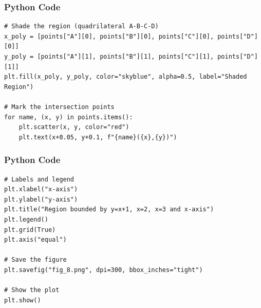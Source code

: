 \documentclass{beamer}
\begin{document}
 \begin{frame}[fragile]
\frametitle{Python Code}
\begin{lstlisting}
# Shade the region (quadrilateral A-B-C-D)
x_poly = [points["A"][0], points["B"][0], points["C"][0], points["D"][0]]
y_poly = [points["A"][1], points["B"][1], points["C"][1], points["D"][1]]
plt.fill(x_poly, y_poly, color="skyblue", alpha=0.5, label="Shaded Region")

# Mark the intersection points
for name, (x, y) in points.items():
    plt.scatter(x, y, color="red")
    plt.text(x+0.05, y+0.1, f"{name}({x},{y})")

\end{lstlisting}
\end{frame}

 \begin{frame}[fragile]
\frametitle{Python Code}
\begin{lstlisting}
# Labels and legend
plt.xlabel("x-axis")
plt.ylabel("y-axis")
plt.title("Region bounded by y=x+1, x=2, x=3 and x-axis")
plt.legend()
plt.grid(True)
plt.axis("equal")

# Save the figure
plt.savefig("fig_8.png", dpi=300, bbox_inches="tight")

# Show the plot
plt.show()
\end{lstlisting}
\end{frame}
\end{document}
